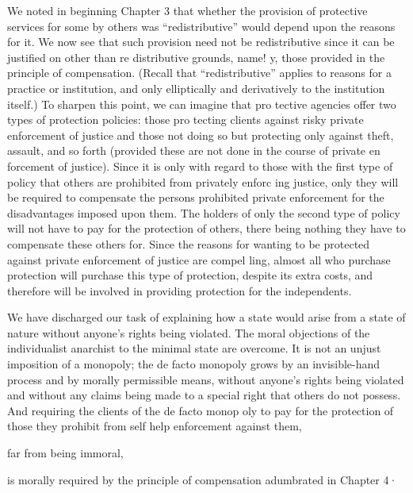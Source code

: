 \documentclass[11pt,openany]{book}
\begin{document}
We noted in beginning Chapter 3 that whether the provision of protective services for some by others was ``redistributive'' would depend upon the reasons for it. We now see that such provision need not be redistributive since it can be justified on other than re distributive grounds, name! y, those provided in the principle of compensation. (Recall that ``redistributive'' applies to reasons for a practice or institution, and only elliptically and derivatively to the institution itself.) To sharpen this point, we can imagine that pro tective agencies offer two types of protection policies: those pro tecting clients against risky private enforcement of justice and those not doing so but protecting only against theft, assault, and so forth (provided these are not done in the course of private en forcement of justice). Since it is only with regard to those with the first type of policy that others are prohibited from privately enforc ing justice, only they will be required to compensate the persons prohibited private enforcement for the disadvantages imposed upon them. The holders of only the second type of policy will not have to pay for the protection of others, there being nothing they have to compensate these others for. Since the reasons for wanting to be protected against private enforcement of justice are compel ling, almost all who purchase protection will purchase this type of protection, despite its extra costs, and therefore will be involved in providing protection for the independents. 

We have discharged our task of explaining how a state would arise from a state of nature without anyone's rights being violated. The moral objections of the individualist anarchist to the minimal state are overcome. It is not an unjust imposition of a monopoly; the de facto monopoly grows by an invisible-hand process and by morally permissible means, without anyone's rights being violated and without any claims being made to a special right that others do not possess. And requiring the clients of the de facto monop oly to pay for the protection of those they prohibit from self help enforcement against them, 

far from being immoral, 

is morally required by the principle of compensation adumbrated in Chapter 4· 
\end{document}
